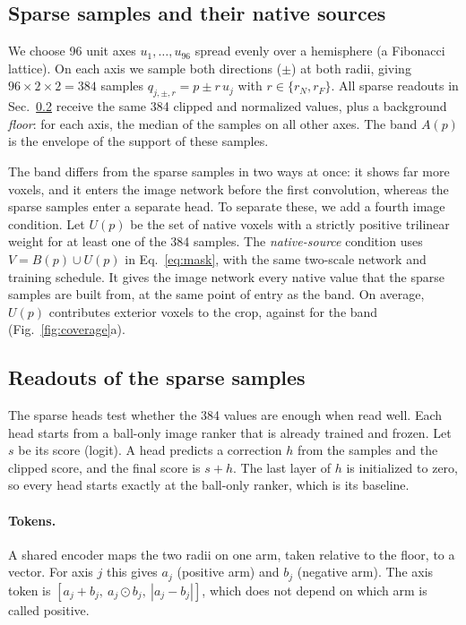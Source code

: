 \subsection{Sparse samples and their native sources}
\label{sec:source_method}

We choose 96 unit axes $u_1,\dots,u_{96}$ spread evenly over a hemisphere (a Fibonacci lattice). On each axis we sample both directions ($\pm$) at both radii, giving $96\times2\times2=384$ samples $q_{j,\pm,r}=p\pm r\,u_j$ with $r\in\{r_N,r_F\}$. All sparse readouts in Sec.~\ref{sec:sparse_method} receive the same 384 clipped and normalized values, plus a background \emph{floor}: for each axis, the median of the samples on all other axes. The band $A(p)$ is the envelope of the support of these samples.

The band differs from the sparse samples in two ways at once: it shows far more voxels, and it enters the image network before the first convolution, whereas the sparse samples enter a separate head. To separate these, we add a fourth image condition. Let $U(p)$ be the set of native voxels with a strictly positive trilinear weight for at least one of the 384 samples. The \emph{native-source} condition uses $V=B(p)\cup U(p)$ in Eq.~\eqref{eq:mask}, with the same two-scale network and training schedule. It gives the image network every native value that the sparse samples are built from, at the same point of entry as the band. On average, $U(p)$ contributes \QuerySources{} exterior voxels to the crop, against \BandSources{} for the band (Fig.~\ref{fig:coverage}a).

\subsection{Readouts of the sparse samples}
\label{sec:sparse_method}

The sparse heads test whether the 384 values are enough when read well. Each head starts from a ball-only image ranker that is already trained and frozen. Let $s$ be its score (logit). A head predicts a correction $h$ from the samples and the clipped score, and the final score is $s+h$. The last layer of $h$ is initialized to zero, so every head starts exactly at the ball-only ranker, which is its baseline.

\paragraph{Tokens.} A shared encoder maps the two radii on one arm, taken relative to the floor, to a vector. For axis $j$ this gives $a_j$ (positive arm) and $b_j$ (negative arm). The axis token is $[a_j+b_j,\ a_j\odot b_j,\ |a_j-b_j|]$, which does not depend on which arm is called positive.

